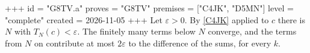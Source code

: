 +++
id = "G8TV.a"
proves = "G8TV"
premises = ["C4JK", "D5MN"]
level = "complete"
created = 2026-11-05
+++
Let $\varepsilon > 0$. By \ref{C4JK} applied to $c$ there is $N$ with $T_N(c) < \varepsilon$. The finitely many terms below $N$ converge, and the terms from $N$ on contribute at most $2 \varepsilon$ to the difference of the sums, for every $k$.
